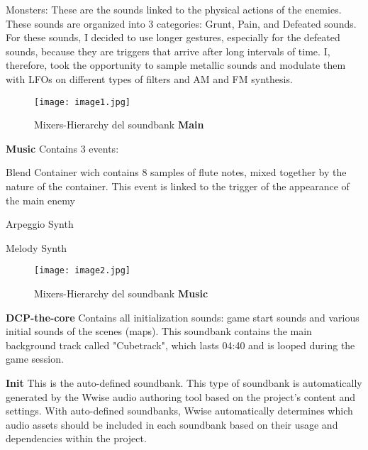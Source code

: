 \begin{compactitem}
\begin{compactitem}
				\item Monsters: These are the sounds linked to the physical actions of the enemies. These sounds are organized into 3 categories: Grunt, Pain, and Defeated sounds.
				For these sounds, I decided to use longer gestures, especially for the defeated sounds, because they are triggers that arrive after long intervals of time. I, therefore, took the opportunity to sample metallic sounds and modulate them with LFOs on different types of filters and AM and FM synthesis.
			\end{compactitem}
		
		\begin{figure}[h]
			\begin{center}
				\texttt{[image: image1.jpg]}
				\caption{Mixers-Hierarchy del soundbank \textbf{Main}}
			\end{center}
		\end{figure}
		
		\item \textbf{Music} Contains 3 events:
			\begin{compactitem}
				\item Blend Container wich contains 8 samples of flute notes, mixed together by the nature of the container. This event is linked to the trigger of the appearance of the main enemy
				\item Arpeggio Synth
				\item Melody Synth
			\end{compactitem}
		\begin{figure}[h]
			\begin{center}
				\texttt{[image: image2.jpg]}
				\caption{Mixers-Hierarchy del soundbank \textbf{Music}}
			\end{center}
		\end{figure}
		
		\item \textbf{DCP-the-core} Contains all initialization sounds: game start sounds and various initial sounds of the scenes (maps). This soundbank contains the main background track called "Cubetrack", which lasts 04:40 and is looped during the game session.
		
		\item \textbf{Init} This is the auto-defined soundbank. This type of soundbank is automatically generated by the Wwise audio authoring tool based on the project's content and settings.		
		With auto-defined soundbanks, Wwise automatically determines which audio assets should be included in each soundbank based on their usage and dependencies within the project.
	\end{compactitem}


